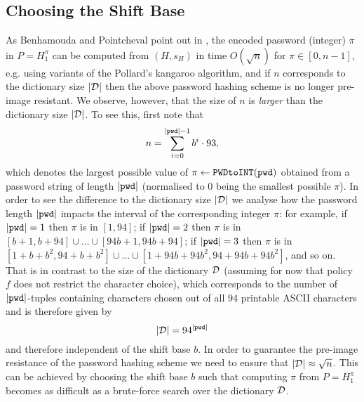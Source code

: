 \subsection{Choosing the Shift Base}\label{rem:basischoice}
As Benhamouda and Pointcheval point out in \cite{BenhamoudaP13}, the encoded password (integer) $\pi$ in $P=H_1^\pi$ can be computed from $(H, s_H)$ in time $O(\sqrt{n})$ for $\pi \in [0,n-1]$, e.g. using variants of the Pollard's kangaroo algorithm, and if $n$ corresponds to the dictionary size $|\mathcal{D}|$ then the above password hashing scheme is no longer pre-image resistant. We observe, however, that
the size of $n$ is \emph{larger} than the dictionary size $|\mathcal{D}|$. To see this, first note that 
\[n=\sum_{i=0}^{|\mathtt{pwd}|-1}b^i\cdot 93,\] 
which denotes the largest possible value of $\pi \gets \texttt{PWDtoINT}(\mathtt{pwd})$ obtained from a password string of length $|\mathtt{pwd}|$ (normalised to $0$ being the smallest possible $\pi$). 
In order to see the difference to the dictionary size $|\mathcal{D}|$ we analyse how the password length $|\mathtt{pwd}|$ impacts the interval of the corresponding integer $\pi$: for example, if $|\mathtt{pwd}| = 1$ then $\pi$ is in $[1,94]$; if $|\mathtt{pwd}|=2$ then $\pi$ is in $[b+1,b+94]\cup \dots \cup[94b+1,94b+94]$; if $|\mathtt{pwd}|=3$ then $\pi$ is in  $[1+b+b^2,94+b+b^2]\cup\dots\cup[1+94b+94b^2,94+94b+94b^2]$, and so on. 
That is in contrast to the size of the dictionary $\mathcal{D}$ (assuming for now that policy $f$ does not restrict the character choice), which corresponds to the number of $|\mathtt{pwd}|$-tuples containing characters chosen out of all $94$ printable ASCII characters and is therefore given by 
\[|\mathcal{D}| = 94^{|\mathtt{pwd}|}\]
and therefore independent of the shift base $b$.
In order to guarantee the pre-image resistance of the password hashing scheme we need to ensure that $|\mathcal{D}| \approx \sqrt{n}$.
This can be achieved by choosing the shift base $b$ such that computing $\pi$ from $P=H_1^\pi$ becomes as difficult as a brute-force search over the dictionary $\mathcal{D}$. 
